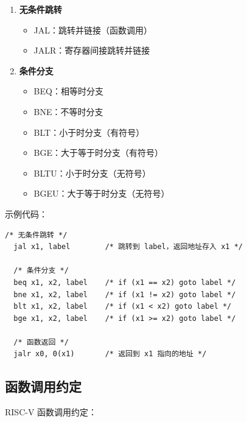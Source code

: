 
\begin{enumerate}
  \item \textbf{无条件跳转}
    \begin{itemize}
      \item JAL：跳转并链接（函数调用）
      \item JALR：寄存器间接跳转并链接
    \end{itemize}

  \item \textbf{条件分支}
    \begin{itemize}
      \item BEQ：相等时分支
      \item BNE：不等时分支
      \item BLT：小于时分支（有符号）
      \item BGE：大于等于时分支（有符号）
      \item BLTU：小于时分支（无符号）
      \item BGEU：大于等于时分支（无符号）
    \end{itemize}
\end{enumerate}

示例代码：
\begin{lstlisting}[language={[RISC-V]Assembler}]
  /* 无条件跳转 */
  jal x1, label        /* 跳转到 label，返回地址存入 x1 */

  /* 条件分支 */
  beq x1, x2, label    /* if (x1 == x2) goto label */
  bne x1, x2, label    /* if (x1 != x2) goto label */
  blt x1, x2, label    /* if (x1 < x2) goto label */
  bge x1, x2, label    /* if (x1 >= x2) goto label */

  /* 函数返回 */
  jalr x0, 0(x1)       /* 返回到 x1 指向的地址 */
\end{lstlisting}

\subsection{函数调用约定}


RISC-V 函数调用约定：

